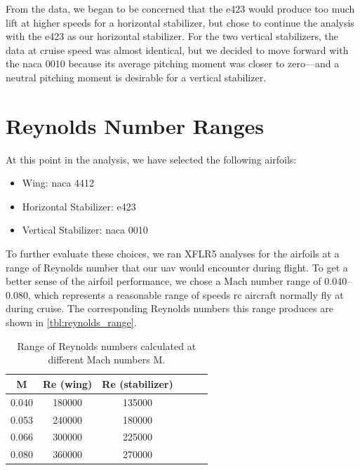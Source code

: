 From the data, we began to be concerned that the \acrshort{e}423 would produce too much lift at higher speeds for a horizontal stabilizer, but chose to continue the analysis with the \acrshort{e}423 as our horizontal stabilizer. For the two vertical stabilizers, the data at cruise speed was almost identical, but we decided to move forward with the \acrshort{naca} 0010 because its average pitching moment was closer to zero—and a neutral pitching moment is desirable for a vertical stabilizer.

\section{Reynolds Number Ranges}

At this point in the analysis, we have selected the following airfoils:

\begin{itemize}
    \item Wing: \acrshort{naca} 4412
    \item Horizontal Stabilizer: \acrshort{e}423
    \item Vertical Stabilizer: \acrshort{naca} 0010
\end{itemize}

To further evaluate these choices, we ran XFLR5 analyses for the airfoils at a range of Reynolds number that our \acrshort{uav} would encounter during flight. To get a better sense of the airfoil performance, we chose a Mach number range of \numrange{0.040}{0.080}, which represents a reasonable range of speeds \acrfull{rc} aircraft normally fly at during cruise. The corresponding Reynolds numbers this range produces are shown in \autoref{tbl:reynolds_range}.

\begin{table}[htpb]
    \centering
    \caption[Range of Reynolds numbers]{Range of Reynolds numbers calculated at different Mach numbers \gls{M}.}
    \begin{tabular}{cccccc}
        \toprule
        \textbf{\gls{M}} & \textbf{\gls{Re} (wing)} & \textbf{\gls{Re} (stabilizer)} \\
        \midrule
        \num{0.040} & \num{180000} & \num{135000} \\
        \num{0.053} & \num{240000} & \num{180000} \\
        \num{0.066} & \num{300000} & \num{225000} \\
        \num{0.080} & \num{360000} & \num{270000} \\
    \end{tabular}
    \label{tbl:reynolds_range}
\end{table}

